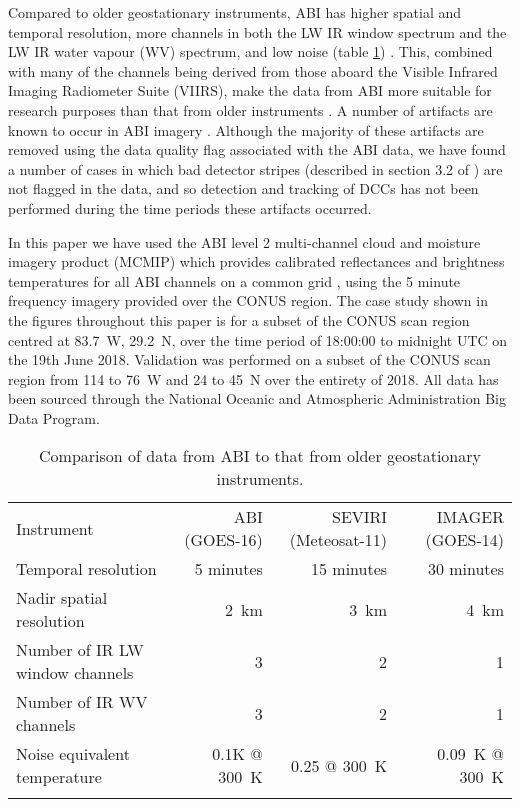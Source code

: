 Compared to older geostationary instruments, ABI has higher spatial and temporal resolution, more channels in both the LW IR window spectrum and the LW IR water vapour (WV) spectrum, and low noise (table \ref{table:abi_comparison}) \citep{iacovazzi_goes-16_2020}.
This, combined with many of the channels being derived from those aboard the Visible Infrared Imaging Radiometer Suite (VIIRS), make the data from ABI more suitable for research purposes than that from older instruments \citep{heidinger_chapter_2020}.
A number of artifacts are known to occur in ABI imagery \citep{gunshor_goes-r_2020}.
Although the majority of these artifacts are removed using the data quality flag associated with the ABI data, we have found a number of cases in which bad detector stripes (described in section 3.2 of \citet{gunshor_goes-r_2020}) are not flagged in the data, and so detection and tracking of DCCs has not been performed during the time periods these artifacts occurred.

In this paper we have used the ABI level 2 multi-channel cloud and moisture imagery product (MCMIP) which provides calibrated reflectances and brightness temperatures for all ABI channels on a common grid \citep{schmit_chapter_2020}, using the 5 minute frequency imagery provided over the CONUS region.
The case study shown in the figures throughout this paper is for a subset of the CONUS scan region centred at 83.7\textdegree~W, 29.2\textdegree~N, over the time period of 18:00:00 to midnight UTC on the 19th June 2018.
Validation was performed on a subset of the CONUS scan region from 114 to 76\textdegree~W and 24 to 45\textdegree~N over the entirety of 2018.
All data has been sourced through the National Oceanic and Atmospheric Administration Big Data Program.

\begin{center}
\begin{table}[t]
\caption{}
\label{table:abi_comparison}
\begin{tabular}{lrrr}
\tophline
Instrument                      & ABI (GOES-16) & SEVIRI (Meteosat-11) & IMAGER (GOES-14) \\
\middlehline
Temporal resolution             & 5 minutes     & 15 minutes   & 30 minutes       \\
Nadir spatial resolution        & 2~km          & 3~km         & 4~km             \\
Number of IR LW window channels & 3             & 2            & 1                \\
Number of IR WV channels        & 3             & 2            & 1                \\
Noise equivalent temperature    & 0.1K @ 300~K  & 0.25 @ 300~K & 0.09~K @ 300~K       \\
\bottomhline
\end{tabular}
\caption{Comparison of data from ABI to that from older geostationary instruments.} %
\end{table}
\end{center}

